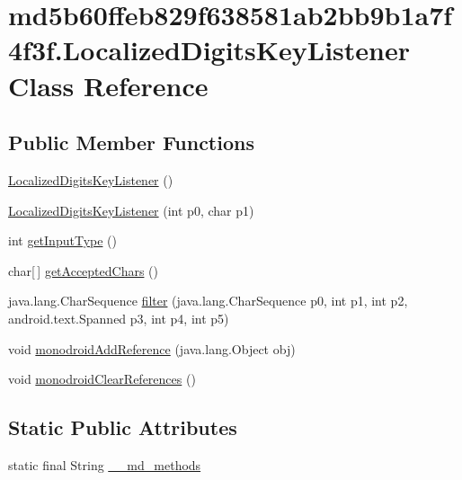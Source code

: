 \hypertarget{classmd5b60ffeb829f638581ab2bb9b1a7f4f3f_1_1_localized_digits_key_listener}{
\section{md5b60ffeb829f638581ab2bb9b1a7f4f3f.LocalizedDigitsKeyListener Class Reference}
\label{classmd5b60ffeb829f638581ab2bb9b1a7f4f3f_1_1_localized_digits_key_listener}
}
\subsection*{Public Member Functions}
\begin{CompactItemize}
\item 
\hyperlink{classmd5b60ffeb829f638581ab2bb9b1a7f4f3f_1_1_localized_digits_key_listener_cf751704952ad7860713321b22d9f7a8}{LocalizedDigitsKeyListener} ()
\item 
\hyperlink{classmd5b60ffeb829f638581ab2bb9b1a7f4f3f_1_1_localized_digits_key_listener_6d87d28f4bbd94c7c2951d999a330b40}{LocalizedDigitsKeyListener} (int p0, char p1)
\item 
int \hyperlink{classmd5b60ffeb829f638581ab2bb9b1a7f4f3f_1_1_localized_digits_key_listener_d2ee9df5ab9a58dc5587f8e51bc2ae86}{getInputType} ()
\item 
char\mbox{[}$\,$\mbox{]} \hyperlink{classmd5b60ffeb829f638581ab2bb9b1a7f4f3f_1_1_localized_digits_key_listener_7b55b3fb569ac307d24bb5e4bbe1edb4}{getAcceptedChars} ()
\item 
java.lang.CharSequence \hyperlink{classmd5b60ffeb829f638581ab2bb9b1a7f4f3f_1_1_localized_digits_key_listener_27713736596f0402b77820159014e506}{filter} (java.lang.CharSequence p0, int p1, int p2, android.text.Spanned p3, int p4, int p5)
\item 
void \hyperlink{classmd5b60ffeb829f638581ab2bb9b1a7f4f3f_1_1_localized_digits_key_listener_a59c658d0bc78ec1affdbe58599ce60e}{monodroidAddReference} (java.lang.Object obj)
\item 
void \hyperlink{classmd5b60ffeb829f638581ab2bb9b1a7f4f3f_1_1_localized_digits_key_listener_1cc96ff80d2ae18b0cfa194517fa6aa3}{monodroidClearReferences} ()
\end{CompactItemize}
\subsection*{Static Public Attributes}
\begin{CompactItemize}
\item 
static final String \hyperlink{classmd5b60ffeb829f638581ab2bb9b1a7f4f3f_1_1_localized_digits_key_listener_c9b095fc4313cfd1f41cf5978338382c}{\_\-\_\-md\_\-methods}
\end{CompactItemize}
